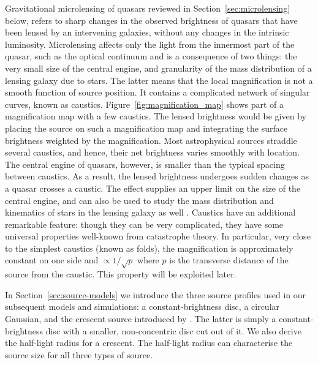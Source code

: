 \documentclass[usenatbib]{mn2e}
\begin{document}
Gravitational microlensing of quasars reviewed in
Section~\ref{sec:microlensing} below, refers to sharp changes in the
observed brightness of quasars that have been lensed by an intervening
galaxies, without any changes in the intrinsic luminosity.
Microlensing affects only the light from the innermost part of the
quasar, such as the optical continuum
\citep[e.g.,][]{2012A&A...544A..62S} and is a consequence of two
things: the very small size of the central engine, and granularity of
the mass distribution of a lensing galaxy due to stars.  The latter
means that the local magnification is not a smooth function of source
position. It contains a complicated network of singular curves, known
as caustics.  Figure~\ref{fig:magnification_map} shows part of a
magnification map with a few caustics.  The lensed brightness would be
given by placing the source on such a magnification map and
integrating the surface brightness weighted by the magnification.
Most astrophysical sources straddle several caustics, and hence, their
net brightness varies smoothly with location.  The central engine of
quasars, however, is smaller than the typical spacing between
caustics.  As a result, the lensed brightness undergoes sudden changes
as a quasar crosses a caustic.  The effect supplies an upper limit on
the size of the central engine, and can also be used to study the mass
distribution and kinematics of stars in the lensing galaxy as well
\citep[e.g.,][]{2012ApJ...744..111P}.  Caustics have an additional
remarkable feature: though they can be very complicated, they have
some universal properties well-known from catastrophe theory.  In
particular, very close to the simplest caustics (known as folds), the
magnification is approximately constant on one side and
$\propto1/\sqrt p$ where $p$ is the transverse distance of the source
from the caustic.  This property will be exploited later.

In Section~\ref{sec:source-models} we introduce the three source
profiles used in our subsequent models and simulations: a
constant-brightness disc, a circular Gaussian, and the crescent source
introduced by \citep{2013MNRAS.434..765K}.  The latter is simply a
constant-brightness disc with a smaller, non-concentric disc cut out
of it.  We also derive the half-light radius for a crescent.  The
half-light radius can characterise the source size for all three types
of source.
\end{document}
